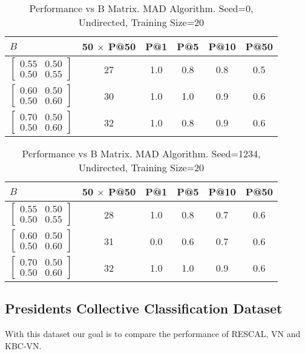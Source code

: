 \documentclass{tufte-handout}
\begin{document}
\begin{table}[htbp]
  \begin{tabular}{l c c c c c}
    $B$ & 50 $\times$ P@50 & P@1 & P@5 & P@10 & P@50 \\ \toprule
  $\begin{bmatrix} 0.55 & 0.50 \\0.50 &0.55 \end{bmatrix}$ & 27 & 1.0 & 0.8 & 0.8 & 0.5 \\
  $\begin{bmatrix} 0.60 & 0.50 \\0.50 &0.60 \end{bmatrix}$ & 30 & 1.0 & 1.0 & 0.9 & 0.6 \\
  $\begin{bmatrix} 0.70 & 0.50 \\0.50 &0.60 \end{bmatrix}$ & 32 & 1.0 & 0.8 & 0.9 & 0.6 \\
  \end{tabular}
  \caption{Performance vs B Matrix. MAD Algorithm. Seed=0, Undirected, Training Size=20}
  \label{tab:perf-vs-b}
\end{table}

\begin{table}[!htbp]
  \begin{tabular}{l c c c c c}
    $B$ & 50 $\times$ P@50 & P@1 & P@5 & P@10 & P@50 \\ \toprule
  $\begin{bmatrix} 0.55 & 0.50 \\0.50 &0.55 \end{bmatrix}$ & 28 & 1.0 & 0.8 & 0.7 & 0.6 \\
  $\begin{bmatrix} 0.60 & 0.50 \\0.50 &0.60 \end{bmatrix}$ & 31 & 0.0 & 0.6 & 0.7 & 0.6 \\
  $\begin{bmatrix} 0.70 & 0.50 \\0.50 &0.60 \end{bmatrix}$ & 32 & 1.0 & 1.0 & 0.9 & 0.6 \\
  \end{tabular}
  \caption{Performance vs B Matrix. MAD Algorithm. Seed=1234, Undirected, Training Size=20}
  \label{tab:perf-vs-b}
\end{table}

\pagebreak
\subsection{Presidents Collective Classification Dataset}
\label{sec:pres-coll-class}
With this dataset our goal is to compare the performance of
RESCAL, VN and KBC-VN.
\end{document}
